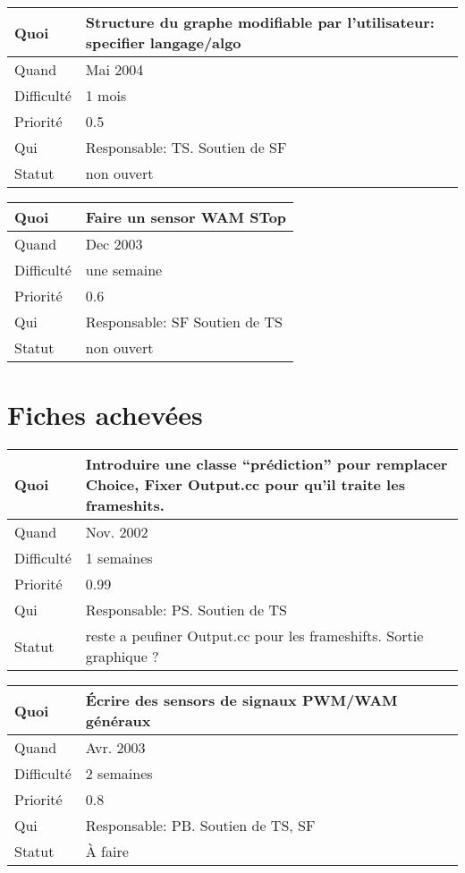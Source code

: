 \documentclass[a4paper,11pt]{article}
\begin{document}
\begin{longtable}{|l|p{7cm}|}\hline
  Quoi & Structure du graphe modifiable par l'utilisateur: specifier
langage/algo \\\hline
  Quand   & Mai 2004 \\\hline
  Difficult\'e & 1 mois \\\hline
  Priorit\'e &  0.5\\\hline
  Qui & Responsable: TS. Soutien de SF\\\hline
  Statut & non ouvert\\\hline
\end{longtable}

\begin{longtable}{|l|p{7cm}|}\hline
  Quoi & Faire un sensor WAM STop\\\hline
  Quand  &  Dec 2003\\\hline
  Difficult\'e & une semaine\\\hline
  Priorit\'e &  0.6\\\hline
  Qui & Responsable: SF  Soutien de TS\\\hline
  Statut & non ouvert\\\hline
\end{longtable}

\section{Fiches achev\'ees}
 
\begin{longtable}{|l|p{7cm}|}\hline
  Quoi & Introduire une classe ``pr\'ediction'' pour remplacer Choice, Fixer Output.cc pour qu'il traite les frameshits.\\\hline
  Quand  &  Nov. 2002\\\hline
  Difficult\'e &  1 semaines\\\hline
  Priorit\'e & 0.99 \\\hline
  Qui & Responsable: PS. Soutien de TS\\\hline
  Statut & reste a peufiner Output.cc pour les frameshifts. Sortie graphique ?\\\hline
\end{longtable}

\begin{longtable}{|l|p{7cm}|}\hline
  Quoi & \'Ecrire des sensors de signaux PWM/WAM g\'en\'eraux\\\hline
  Quand  &  Avr. 2003\\\hline
  Difficult\'e &  2 semaines\\\hline
  Priorit\'e &  0.8 \\\hline
  Qui & Responsable: PB. Soutien de TS, SF\\\hline
  Statut & \`A faire\\\hline
\end{longtable}
\end{document}
